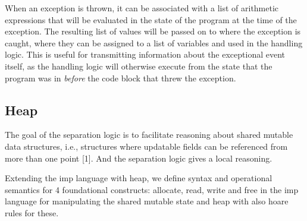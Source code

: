 When an exception is thrown, it can be associated with a list of arithmetic expressions that will be evaluated in the state of the program at the time of the exception. The resulting list of values will be passed on to where the exception is caught, where they can be assigned to a list of variables and used in the handling logic. This is useful for transmitting information about the exceptional event itself, as the handling logic will otherwise execute from the state that the program was in \emph{before} the code block that threw the exception.

\subsection{Heap}
The goal of the separation logic is to facilitate reasoning about shared mutable data structures, i.e., structures where updatable fields can be referenced from more than one point [1].  And the separation logic gives a local reasoning.

Extending the imp language with heap, we define syntax and operational semantics  for 4 foundational constructs: allocate, read, write and free in the imp language for manipulating the shared mutable state and heap with also hoare rules for these.
